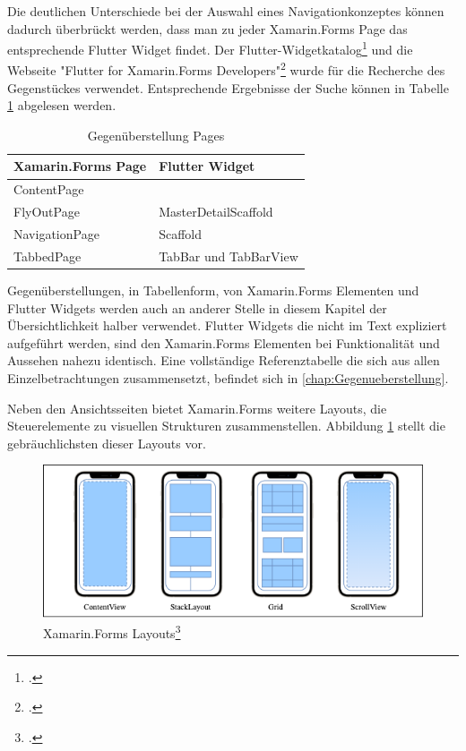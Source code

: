 Die deutlichen Unterschiede bei der Auswahl eines Navigationkonzeptes können dadurch überbrückt werden, dass man zu jeder Xamarin.Forms Page das entsprechende Flutter Widget findet.  Der Flutter-Widgetkatalog\footcite[Vgl.][Abgerufen am \today]{GoogleFlutterWidgetCatalog2020} und die Webseite "Flutter for Xamarin.Forms Developers"\footcite[Vgl.][Abgerufen am \today]{FlutterForXFDevs} wurde für die Recherche des Gegenstückes verwendet.  Entsprechende Ergebnisse der Suche können in Tabelle \ref{tab:ComapreXFFlutter} abgelesen werden. 


\begin{table}[!ht]
\begin{tabularx}{\textwidth}{X|X}
   \textbf{Xamarin.Forms Page} & \textbf{Flutter Widget}  \\
\hline
	ContentPage            &           	\\ 
	FlyOutPage             & MasterDetailScaffold          	\\ 
	NavigationPage       & Scaffold         	 					\\ 
	TabbedPage            & TabBar und TabBarView 		\\ 
\end{tabularx}
\caption{Gegenüberstellung Pages}
 \label{tab:ComapreXFFlutter}
\end{table}
Gegenüberstellungen,  in Tabellenform,  von Xamarin.Forms Elementen und Flutter Widgets werden auch an anderer Stelle in diesem Kapitel der Übersichtlichkeit halber verwendet.  Flutter Widgets die nicht im Text expliziert aufgeführt werden,  sind den Xamarin.Forms Elementen bei Funktionalität und Aussehen nahezu identisch.  Eine vollständige Referenztabelle die sich aus allen Einzelbetrachtungen zusammensetzt, befindet sich in \ref{chap:Gegenueberstellung}. 

Neben den Ansichtsseiten bietet Xamarin.Forms weitere Layouts,  die Steuerelemente zu visuellen Strukturen zusammenstellen.  Abbildung \ref{fig:Xamarin.Forms Layouts} stellt die gebräuchlichsten dieser Layouts vor. 

\begin{figure}[!ht]
 \includegraphics[width=\textwidth,height=\textheight,keepaspectratio]{Images/CrossPlattformFrameworks/XamarinFormsLayouts.png}
 \caption[Xamarin.Forms Layouts]{Xamarin.Forms Layouts\footcite{MicrosoftXamViews2020}}
 \label{fig:Xamarin.Forms Layouts}
\end{figure}

